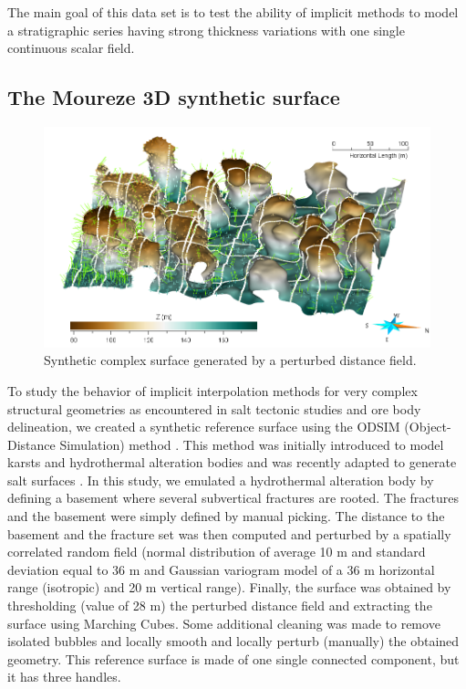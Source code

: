 \documentclass[final]{ring20}
\begin{document}
The main goal of this data set is to test the ability of implicit methods to model a stratigraphic series having strong thickness variations with one single continuous scalar field. 


\subsection{The Moureze 3D synthetic surface}

\begin{figure}
\centering\includegraphics[width=\textwidth]{Moureze}
\caption{Synthetic complex surface generated by a perturbed distance field.}
\label{fig:Moureze}
\end{figure}

To study the behavior of implicit interpolation methods for very complex structural geometries as encountered in salt tectonic studies and ore body delineation, we created a synthetic reference surface using the ODSIM (Object-Distance Simulation) method \citep{Henrion2010MG}. This method was initially introduced to model karsts and hydrothermal alteration bodies \citep{Henrion2008PEIGC,Rongier2014G} and was recently adapted to generate salt surfaces \citep{Clausolles20188ECE2}. In this study, we emulated a hydrothermal alteration body by defining a basement where several subvertical fractures are rooted. The fractures and the basement were simply defined by manual picking. The distance to the basement and the fracture set was then computed and perturbed by a spatially correlated random field (normal distribution of average 10 m and standard deviation equal to 36 m and Gaussian variogram model of a 36 m horizontal range (isotropic) and 20 m vertical range). Finally, the surface was obtained 
by thresholding (value of 28 m) the perturbed distance field and extracting the surface using Marching Cubes. Some additional cleaning was made to remove isolated bubbles and locally smooth and locally perturb (manually) the obtained geometry. This reference surface is made of one single connected component, but it has three handles.  
\end{document}
